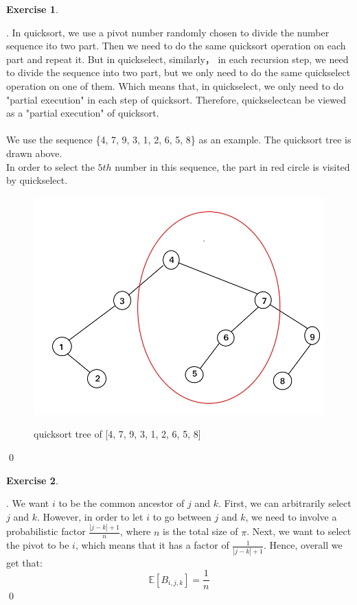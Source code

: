 \documentclass[12pt, notitlepage]{article}
\newtheorem{ex}{Exercise}
\newenvironment{sol}
  {\par\vspace{3mm}\noindent{\it Solution}.}{\qed}
\begin{document}
\begin{ex}\end{ex}
\begin{sol}
In quicksort, we use a pivot number randomly chosen to divide the number sequence ito two part. Then we need to do the same quicksort operation on each part and repeat it. But in quickselect, similarly， in each recursion step, we need to divide the sequence into two part, but we only need to do the same quickselect operation on one of them. Which means that, in quickselect, we only need to do "partial execution" in each step of quicksort. Therefore, quickselectcan be viewed as a "partial execution" of quicksort. \\ \\
We use the sequence \{4, 7, 9, 3, 1, 2, 6, 5, 8\} as an example. The quicksort tree is drawn above.\\
In order to select the $5th$ number in this sequence, the part in red circle is visited by quickselect.
\begin{figure}[H]
	\center
	\includegraphics[width=0.8\linewidth]{p1.jpg}\vspace{-10pt}
	\caption{quicksort tree of [4, 7, 9, 3, 1, 2, 6, 5, 8]} \nonumber\label{fig:quicksort tree}\vspace{-10pt}
\end{figure}
\end{sol}


\begin{ex}\end{ex}

\begin{sol}
We want $i$ to be the common ancestor of $j$ and $k$. First, we can arbitrarily select $j$ and $k$. However, in order to let $i$ to go between $j$ and $k$, we need to involve a probabilistic factor $\frac{|j - k|+1}{n}$, where $n$ is the total size of $\pi$. Next, we want to select the pivot to be $i$, which means that it has a factor of $\frac{1}{|j-k| + 1}$. Hence, overall we get that:
\[
\mathbb{E}[B_{i, j, k}] = \frac{1}{n}
\]
\end{sol}
\end{document}
